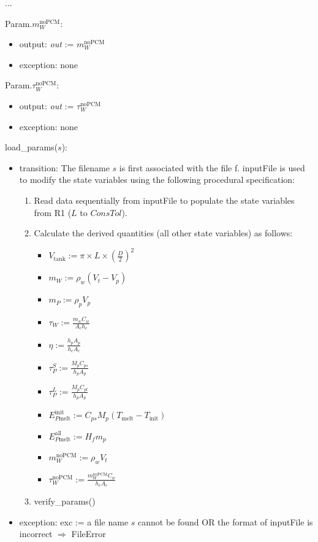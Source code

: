 \documentclass[12pt]{article}
\begin{document}
...
~\newline

\noindent Param.$m_W^{\text{noPCM}}$:
\begin{itemize}
\item output: \textit{out} := $m_W^{\text{noPCM}}$
\item exception: none
\end{itemize}

\noindent Param.$\tau_W^{\text{noPCM}}$:
\begin{itemize}
\item output: \textit{out} := $\tau_W^{\text{noPCM}}$
\item exception: none
\end{itemize}

\noindent load\_params($s$):
\begin{itemize}
\item transition: The filename $s$ is first associated with the file f.  {inputFile} is used to
  modify the state variables using the following procedural specification:
\begin{enumerate}
\item Read data sequentially from inputFile to populate the state variables from
  R1 ($L$ to $\mathit{ConsTol}$).
\item Calculate the derived quantities (all other state variables) as follows:
\begin{itemize}
\item $V_{\text{tank}} := \pi \times L \times (\frac{D}{2}) ^ 2$
\item $m_W := \rho_w (V_t - V_p)$
\item $m_P := \rho_p V_p$
\item $\tau_W := \frac{m_w C_w}{A_c h_c}$
\item $\eta := \frac{h_p A_p}{h_c A_c}$
\item $\tau_P^S := \frac{M_p C_{ps}}{h_p A_p}$
\item $\tau_P^L := \frac{M_p C_{pl}}{h_p A_p}$
\item $E_{P\text{melt}}^{\text{init}} := C_{ps} M_p (T_{\text{melt}} - T_{\text{init}})$
\item $E_{P\text{melt}}^{\text{all}} := H_f m_p$
\item $m_W^{\text{noPCM}} := \rho_w  V_t$
\item $\tau_W^{\text{noPCM}} := \frac{m_W^{\text{noPCM}} C_w}{h_c A_c}$
\end{itemize}
\item verify\_params()
\end{enumerate}

\item exception: exc := a file name $s$ cannot be found OR the format of
  inputFile is incorrect $\Rightarrow$  FileError
\end{itemize}
\end{document}
